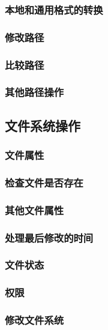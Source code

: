\subsubsection{本地和通用格式的转换}\label{ch20.3.4}

\subsubsection{修改路径}

\subsubsection{比较路径}

\subsubsection{其他路径操作}

\subsection{文件系统操作}

\subsubsection{文件属性}
\subsubsection*{检查文件是否存在}\label{ch20.4.1.1}
\subsubsection*{其他文件属性}
\subsubsection*{处理最后修改的时间}

\subsubsection{文件状态}

\subsubsection{权限}

\subsubsection{修改文件系统}
